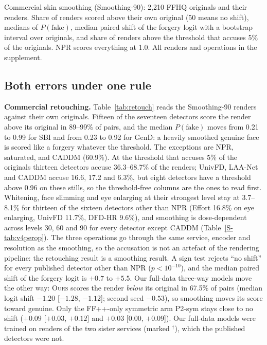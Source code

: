 \documentclass[conference]{IEEEtran}
\newcommand{\ours}{\textsc{Ours}}
\begin{document}
\begin{table}[t]
\centering
\caption{Commercial skin smoothing (Smoothing-90): 2,210 FFHQ originals and their renders. Share of renders scored above their
own original (50 means no shift), medians of $P(\text{fake})$, median paired shift of the forgery logit with a bootstrap
interval over originals, and share of renders above the threshold that accuses 5\% of the originals. NPR scores everything at
1.0. All renders and operations in the supplement.}
\label{tab:retouch}
\scriptsize
\setlength{\tabcolsep}{2.5pt}
\begin{adjustbox}{max width=\columnwidth}\end{adjustbox}
\end{table}

\subsection{Both errors under one rule}
\label{sec:measure}
\textbf{Commercial retouching.} Table~\ref{tab:retouch} reads the Smoothing-90 renders against their own originals. Fifteen of
the seventeen detectors score the render above its original in 89--99\% of pairs, and the median $P(\text{fake})$ moves from
0.21 to 0.99 for SBI and from 0.23 to 0.92 for GenD: a heavily smoothed genuine face is scored like a forgery whatever the
threshold. The exceptions are NPR, saturated, and CADDM (60.9\%). At the threshold that accuses 5\% of the originals thirteen
detectors accuse 36.3--68.7\% of the renders; UnivFD, LAA-Net and CADDM accuse 16.6, 17.2 and 6.3\%, but eight detectors have a
threshold above 0.96 on these stills, so the threshold-free columns are the ones to read first. Whitening, face slimming and eye
enlarging at their strongest level stay at 3.7--8.1\% for thirteen of the sixteen detectors other than NPR (Effort 16.8\% on
eye enlarging, UnivFD 11.7\%, DFD-HR 9.6\%), and smoothing is dose-dependent across levels 30, 60 and 90 for every detector
except CADDM (Table~\ref{S-tab:v4perop}). The three operations go through the same service, encoder and resolution as the
smoothing, so the accusation is not an artefact of the rendering pipeline: the retouching result is a smoothing result.
A sign test rejects ``no shift'' for every published detector other than NPR ($p<10^{-10}$), and the median paired shift of
the forgery logit is $+0.7$ to $+5.5$. Our full-data three-way models move the other way: \ours{} scores the render \emph{below} its
original in 67.5\% of pairs (median logit shift $-1.20$ [$-1.28$, $-1.12$]; second seed $-0.53$), so smoothing moves its score
toward genuine. Only the FF++-only symmetric arm P2-sym stays close to no shift ($+0.09$ [$+0.03$, $+0.12$] and $+0.03$
[$0.00$, $+0.09$]). Our full-data models were trained on renders of the two sister services (marked $^\dagger$), which the
published detectors were not.
\end{document}
